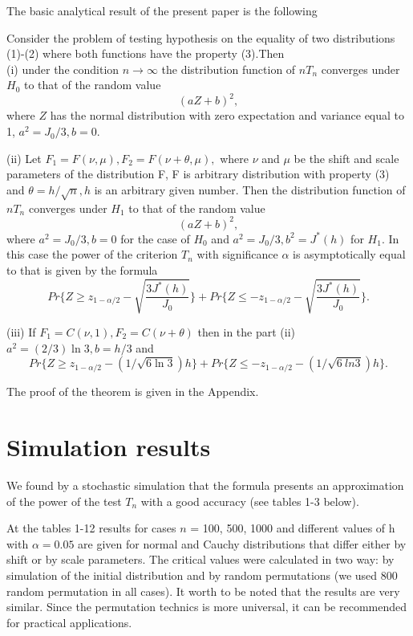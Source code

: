 \documentclass{svproc}
\begin{document}
The basic analytical result of the present paper is the following
\begin{theorem} Consider the problem of testing hypothesis on the equality of two distributions (1)-(2) where both functions have the property (3).Then\\
(i) under the condition $n \to \infty$
the distribution function of $nT_n$  converges under $H_0$ to that of the random value
\begin{equation}\label{Distr}
(aZ + b)^2,
\end{equation}
where  $Z$ has the normal distribution with zero expectation and variance equal to 1, $a^2= J_0/3, b=0$.

(ii)
Let $F_1= F(\nu,\mu),F_2=F(\nu+\theta,\mu),$
where $\nu$  and $\mu$ be the shift and scale parameters of the distribution F, F is arbitrary distribution with property   (3) and
$\theta=h/\sqrt{n},h$ is an arbitrary given number. Then
the distribution function of $nT_n$  converges under $H_1$ to that of the random value
$$
(aZ + b)^2,
$$
where $a^2 = J_0/3, b=0$
for the case of $H_0$ and
$a^2= J_0/3, b^2 = J^*(h)$
for  $H_1$.
In this case the power of the criterion $T_n$ with significance $\alpha$ is asymptotically equal to that is given by the formula
$$
Pr\{Z\geq z_{1-\alpha/2}-\sqrt{\frac {3J^*(h)}{J_0}}\}
+ Pr\{Z\leq - z_{1-\alpha/2}-\sqrt{\frac {3J^*(h)}{J_0}}\}.
$$

(iii) If $F_1=C(\nu,1), F_2=C(\nu + \theta)$ then in the part (ii)
$a^2 =(2/3)\ln 3, b= h/3$ and
$$
Pr\{Z\geq z_{1-\alpha/2}-(1/\sqrt{6\ln 3})h\}
+ Pr\{Z\leq - z_{1-\alpha/2}-(1/\sqrt{6\
ln 3})h\}.
$$
\end{theorem}


The proof of the theorem is given in the Appendix.


\section{Simulation results}


 We found by a stochastic simulation that the formula presents an approximation of the power of the test $T_n$ with a good accuracy (see tables 1-3 below).

 At the tables 1-12 results for cases $n$ = 100, 500, 1000 and different values of h with $\alpha=0.05$ are given for normal and Cauchy distributions that differ either by shift or by scale parameters. The critical values were calculated in two way: by simulation of the initial distribution and by random permutations (we used 800 random permutation in all cases). It worth to be noted that the results are very similar. Since the permutation technics is more universal, it can be recommended for practical applications.
\end{document}
